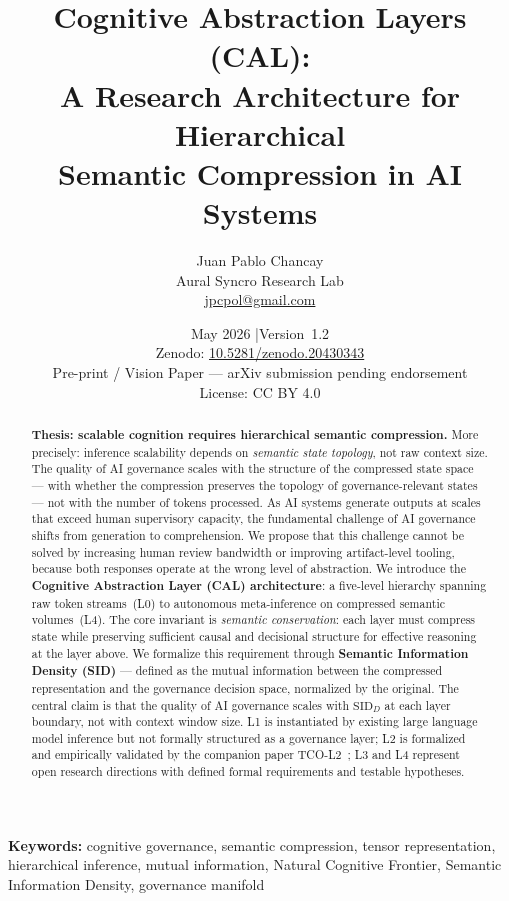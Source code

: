 \documentclass[11pt]{article}
\title{\textbf{Cognitive Abstraction Layers (CAL):\\
A Research Architecture for Hierarchical\\
Semantic Compression in AI Systems}}
\author{Juan Pablo Chancay\\
  \small Aural Syncro Research Lab\\
  \small \href{mailto:jpcpol@gmail.com}{jpcpol@gmail.com}}
\date{May 2026 \quad|\quad Version~1.2\\[4pt]
  \small Zenodo: \href{https://doi.org/10.5281/zenodo.20430343}{10.5281/zenodo.20430343}\\
  \small Pre-print / Vision Paper --- arXiv submission pending endorsement\\
  \small License: CC BY 4.0}
\theoremstyle{definition}
\theoremstyle{remark}
\begin{document}

\maketitle
\thispagestyle{empty}

\begin{abstract}
\textbf{Thesis: scalable cognition requires hierarchical semantic
compression.} More precisely: inference scalability depends on
\emph{semantic state topology}, not raw context size. The quality
of AI governance scales with the structure of the compressed state
space --- with whether the compression preserves the topology of
governance-relevant states --- not with the number of tokens
processed. As AI systems generate outputs at scales that exceed
human supervisory capacity, the fundamental challenge of AI
governance shifts from generation to comprehension. We propose that
this challenge cannot be solved by increasing human review bandwidth
or improving artifact-level tooling, because both responses operate
at the wrong level of abstraction. We introduce the
\textbf{Cognitive Abstraction Layer (CAL) architecture}: a
five-level hierarchy spanning raw token streams~(L0) to autonomous
meta-inference on compressed semantic volumes~(L4). The core
invariant is \emph{semantic conservation}: each layer must compress
state while preserving sufficient causal and decisional structure
for effective reasoning at the layer above. We formalize this
requirement through \textbf{Semantic Information Density (SID)} ---
defined as the mutual information between the compressed
representation and the governance decision space, normalized by the
original. The central claim is that the quality of AI governance
scales with $\text{SID}_D$ at each layer boundary, not with context
window size. L1 is instantiated by existing large language model
inference but not formally structured as a governance layer; L2 is
formalized and empirically validated by the companion paper
TCO-L2~\cite{chancay2026tco}; L3 and L4 represent open research
directions with defined formal requirements and testable hypotheses.
\end{abstract}

\medskip
\noindent\textbf{Keywords:} cognitive governance, semantic compression,
tensor representation, hierarchical inference, mutual information,
Natural Cognitive Frontier, Semantic Information Density,
governance manifold

\tableofcontents
\newpage
\end{document}
